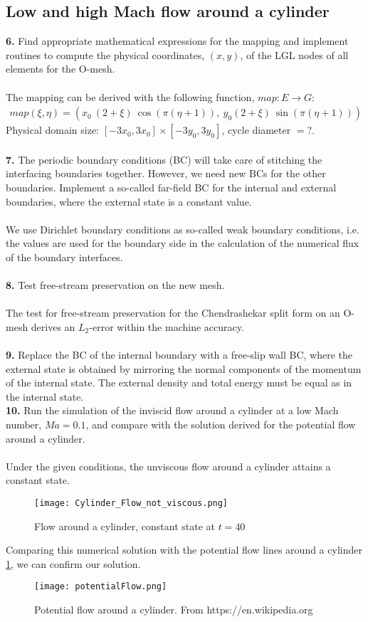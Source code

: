\documentclass[11pt]{scrartcl}
\begin{document}
\subsection{Low and high Mach flow around a cylinder}
\textbf{6.} Find appropriate mathematical expressions for the mapping and implement routines to compute the physical coordinates, $(x,y)$, of the LGL nodes of all elements for the O-mesh.\\ \ \\
The mapping can be derived with the following function, $map: E \rightarrow G$:
\begin{align*}
map(\xi, \eta) = \left( x_0 \ (2 + \xi )\  \cos(\pi (\eta + 1)), \ y_0 (2 + \xi ) \ \sin(\pi (\eta + 1)) \right)
\end{align*}
Physical domain size: $[-3x_0, 3x_0] \times [-3y_0, 3y_0] $, cycle diameter $= ?$.\\ \ \\
\textbf{7.} The periodic boundary conditions (BC) will take care of stitching the interfacing boundaries together. However, we need new BCs for the other boundaries. Implement a so-called far-field BC for the internal and external boundaries, where the external state is a constant value. \\ \ \\
We use Dirichlet boundary conditions as so-called weak boundary conditions, i.e. the values are used for the boundary side in the calculation of the numerical flux of the boundary interfaces. \\ \ \\
\textbf{8.} Test free-stream preservation on the new mesh.\\ \ \\
The test for free-stream preservation for the Chendrashekar split form on an O-mesh derives an $L_2$-error within the machine accuracy. \\ \ \\
\textbf{9.} Replace the BC of the internal boundary with a free-slip wall BC, where the external state is obtained by mirroring the normal components of the momentum of the internal state. The external density and total energy must be equal as in the internal state. \\
\textbf{10.} Run the simulation of the inviscid flow around a cylinder at a low Mach number, $Ma=0.1$, and compare with the solution derived for the potential flow around a cylinder. \\ \ \\
Under the given conditions, the unviscous flow around a cylinder attains a constant state. 
\begin{figure}[H]
\texttt{[image: Cylinder\_Flow\_not\_viscous.png]}
\caption{Flow around a cylinder, constant state at $t = 40 $}
\end{figure} 
Comparing this numerical solution with the potential flow lines around a cylinder \ref{potentialFlow}, we can confirm our solution. \\
\begin{figure}[H]
\centering
\texttt{[image: potentialFlow.png]}
\label{potentialFlow}
\caption{Potential flow around a cylinder. From https://en.wikipedia.org}
\end{figure}
\end{document}
